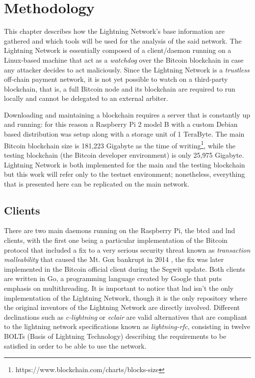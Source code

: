 
	\chapter{Methodology}
	This chapter describes how the Lightning Network's base information are gathered and which tools will be used for the analysis of the said network. The Lightning Network is essentially composed of a client/daemon running on a Linux-based machine that act as a \textit{watchdog} over the Bitcoin blockchain in case any attacker decides to act maliciously. Since the Lightning Network is a \textit{trustless} off-chain payment network, it is not yet possible to watch on a third-party blockchain, that is, a full Bitcoin node and its blockchain are required to run locally and cannot be delegated to an external arbiter.
	
	Downloading and maintaining a blockchain requires a server that is constantly up and running: for this reason a Raspberry Pi 2 model B with a custom Debian based distribution was setup along with a storage unit of 1 TeraByte. The main Bitcoin blockchain size is 181,223 Gigabyte as the time of writing\footnote{https://www.blockchain.com/charts/blocks-size}, while the testing blockchain (the Bitcoin developer environment) is only 25,975 Gigabyte. Lightning Network is both implemented for the main and the testing blockchain but this work will refer only to the testnet environment; nonetheless, everything that is presented here can be replicated on the main network.
	
	\section{Clients}
	
	There are two main daemons running on the Raspberry Pi, the btcd and lnd clients, with the first one being a particular implementation of the Bitcoin protocol that included a fix to a very serious security threat known as \textit{transaction malleability} \cite{Andrychowicz2015} that caused the Mt. Gox bankrupt in 2014 \cite{Decker2014}, the fix was later implemented in the Bitcoin official client during the Segwit update. Both clients are written in Go, a programming language created by Google that puts emphasis on multithreading. It is important to notice that lnd isn't the only implementation of the Lightning Network, though it is the only repository where the original inventors of the Lightning Network are directly involved. Different declinations such as \textit{c-lightning} or \textit{eclair} are valid alternatives that are compliant to the lightning network specifications known as \textit{lightning-rfc}, consisting in twelve BOLTs (Basis of Lightning Technology) describing the requirements to be satisfied in order to be able to use the network.
	
